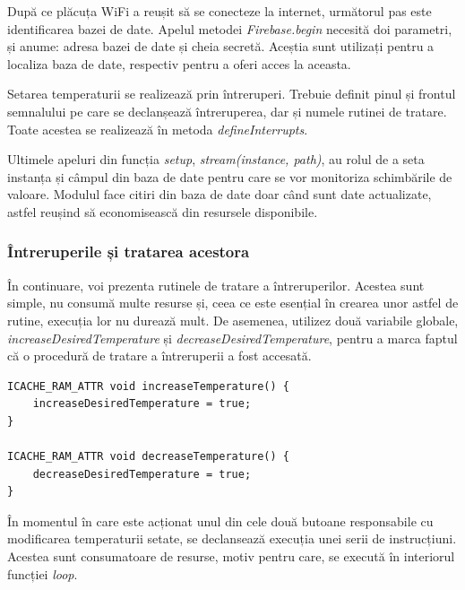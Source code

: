 	După ce plăcuța WiFi a reușit să se conecteze la internet, următorul pas este identificarea bazei de date. Apelul metodei \textit{Firebase.begin} necesită doi parametri, și anume: adresa bazei de date și cheia secretă. Aceștia sunt utilizați pentru a localiza baza de date, respectiv pentru a oferi acces la aceasta.

	Setarea temperaturii se realizează prin întreruperi. Trebuie definit pinul și frontul semnalului pe care se declanșează întreruperea, dar și numele rutinei de tratare. Toate acestea se realizează în metoda \textit{defineInterrupts}.

	Ultimele apeluri din funcția \textit{setup}, \textit{stream(instance, path)}, au rolul de a seta instanța și câmpul din baza de date pentru care se vor monitoriza schimbările de valoare. Modulul face citiri din baza de date doar când sunt date actualizate, astfel reușind să economisească din resursele disponibile.

\subsubsection{Întreruperile și tratarea acestora}

	În continuare, voi prezenta rutinele de tratare a întreruperilor. Acestea sunt simple, nu consumă multe resurse și, ceea ce este esențial în crearea unor astfel de rutine, execuția lor nu durează mult. De asemenea, utilizez două variabile globale, \textit{increaseDesiredTemperature} și \textit{decreaseDesiredTemperature}, pentru a marca faptul că o procedură de tratare a întreruperii a fost accesată.

\vspace{1em}

\begin{lstlisting}
ICACHE_RAM_ATTR void increaseTemperature() {
    increaseDesiredTemperature = true;
}

ICACHE_RAM_ATTR void decreaseTemperature() {
    decreaseDesiredTemperature = true;
}  
\end{lstlisting}

\vspace{2em}	

	În momentul în care este acționat unul din cele două butoane responsabile cu modificarea temperaturii setate, se declansează execuția unei serii de instrucțiuni. Acestea sunt consumatoare de resurse, motiv pentru care, se execută în interiorul funcției \textit{loop}. 


\vspace{1em}

